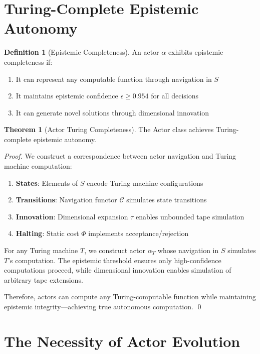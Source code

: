 \documentclass[11pt]{article}
\theoremstyle{definition}
\newtheorem{definition}{Definition}
\newtheorem{theorem}{Theorem}
\begin{document}
\section{Turing-Complete Epistemic Autonomy}

\begin{definition}[Epistemic Completeness]
An actor $\alpha$ exhibits epistemic completeness if:
\begin{enumerate}
    \item It can represent any computable function through navigation in $S$
    \item It maintains epistemic confidence $\epsilon \geq 0.954$ for all decisions
    \item It can generate novel solutions through dimensional innovation
\end{enumerate}
\end{definition}

\begin{theorem}[Actor Turing Completeness]
The Actor class achieves Turing-complete epistemic autonomy.
\end{theorem}

\begin{proof}
We construct a correspondence between actor navigation and Turing machine computation:
\begin{enumerate}
    \item \textbf{States}: Elements of $S$ encode Turing machine configurations
    \item \textbf{Transitions}: Navigation functor $\mathcal{C}$ simulates state transitions
    \item \textbf{Innovation}: Dimensional expansion $\tau$ enables unbounded tape simulation
    \item \textbf{Halting}: Static cost $\Phi$ implements acceptance/rejection
\end{enumerate}

For any Turing machine $T$, we construct actor $\alpha_T$ whose navigation in $S$ simulates $T$'s computation. The epistemic threshold ensures only high-confidence computations proceed, while dimensional innovation enables simulation of arbitrary tape extensions.

Therefore, actors can compute any Turing-computable function while maintaining epistemic integrity—achieving true autonomous computation. \qed
\end{proof}

\section{The Necessity of Actor Evolution}
\end{document}

